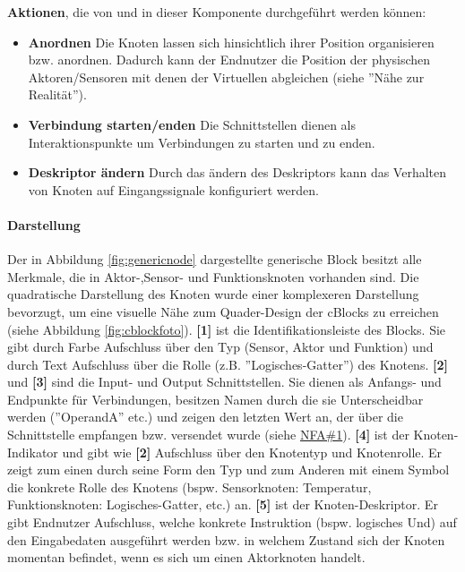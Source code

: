 \textbf{Aktionen}, die von und in dieser Komponente durchgeführt werden können: 
\begin{itemize}
    \item \textbf{Anordnen} Die Knoten lassen sich hinsichtlich ihrer Position organisieren bzw. anordnen. Dadurch kann der Endnutzer die Position der physischen Aktoren/Sensoren mit denen der Virtuellen abgleichen (siehe ''Nähe zur Realität'').
    \item \textbf{Verbindung starten/enden} Die Schnittstellen dienen als Interaktionspunkte um Verbindungen zu starten und zu enden.
    \item \textbf{Deskriptor ändern} Durch das ändern des Deskriptors kann das Verhalten von Knoten auf Eingangssignale konfiguriert werden.
\end{itemize}

\paragraph{Darstellung} Der in Abbildung \ref{fig:genericnode} dargestellte generische Block besitzt alle Merkmale, die in Aktor-,Sensor- und Funktionsknoten vorhanden sind. Die quadratische Darstellung des Knoten wurde einer komplexeren Darstellung bevorzugt, um eine visuelle Nähe zum Quader-Design der cBlocks zu erreichen (siehe Abbildung \ref{fig:cblockfoto}). \textbf{[1]} ist die Identifikationsleiste des Blocks. Sie gibt durch Farbe Aufschluss über den Typ (\colorbox{sensororange}{Sensor}, \colorbox{aktorgreen}{Aktor} und \colorbox{funcviolet}{Funktion}) und durch Text Aufschluss über die Rolle (z.B. ''Logisches-Gatter'') des Knotens. \textbf{[2]} und \textbf{[3]} sind die Input- und Output Schnittstellen. Sie dienen als Anfangs- und Endpunkte für Verbindungen, besitzen Namen durch die sie Unterscheidbar werden (''OperandA'' etc.) und zeigen den letzten Wert an, der über die Schnittstelle empfangen bzw. versendet wurde (siehe \hyperref[tab:NFA1]{NFA\#1}). \textbf{[4]} ist der Knoten-Indikator und gibt wie \textbf{[2]} Aufschluss über den Knotentyp und Knotenrolle. Er zeigt zum einen durch seine Form den Typ und zum Anderen mit einem Symbol die konkrete Rolle des Knotens (bspw. Sensorknoten: Temperatur, Funktionsknoten: Logisches-Gatter, etc.) an. \textbf{[5]} ist der Knoten-Deskriptor. Er gibt Endnutzer Aufschluss, welche konkrete Instruktion (bspw. logisches Und) auf den Eingabedaten ausgeführt werden bzw. in welchem Zustand sich der Knoten momentan befindet, wenn es sich um einen Aktorknoten handelt.

